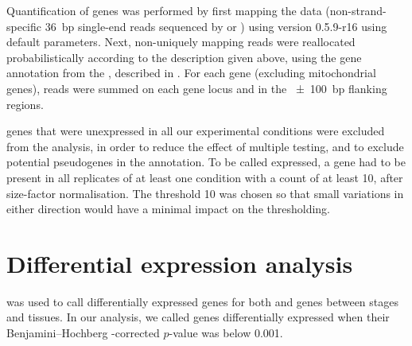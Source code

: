 Quantification of \trna genes was performed by first mapping the  \chipseq
data (non-strand-specific \SI{36}{bp} single-end reads sequenced by
  or ) using
 version 0.5.9-r16 \citep{Li:2009a} using default parameters. Next,
non-uniquely mapping reads were reallocated probabilistically according to the
description given above, using the \trna gene annotation from the , described in \citet{Chan:2009}. For each \trna gene (excluding
mitochondrial \trna genes), reads were summed on each \trna gene locus and in
the \SI{\pm100}{bp} flanking regions.

\trna genes that were unexpressed in all our experimental conditions were
excluded from the analysis, in order to reduce the effect of multiple testing,
and to exclude potential pseudogenes in the annotation. To be called expressed,
a \trna gene had to be present in all replicates of at least one condition with
a count of at least \num{10}, after size-factor normalisation. The threshold
\num{10} was chosen so that small variations in either direction would have a
minimal impact on the thresholding.

%
%
%

\section{Differential expression analysis}

 \citep{Love:2014} was used to call differentially expressed genes
for both \mrna and \trna genes between stages and tissues. In our analysis, we
called genes differentially expressed when their Benjamini–Hochberg
\fdr-corrected \(p\)-value was below \num{0.001}.

